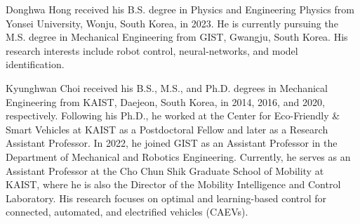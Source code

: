 \documentclass[journal]{IEEEtran}
\newcommand*{\template}{template}
\begin{document}
\begin{IEEEbiography}{Donghwa Hong}
    received his B.S. degree in Physics and Engineering Physics from Yonsei University, Wonju, South Korea, in 2023. He is currently pursuing the M.S. degree in Mechanical Engineering from GIST, Gwangju, South Korea.  
His research interests include robot control, neural-networks, and model identification. 
\end{IEEEbiography}

\begin{IEEEbiography}{Kyunghwan Choi}
    received his B.S., M.S., and Ph.D. degrees in Mechanical Engineering from KAIST, Daejeon, South Korea, in 2014, 2016, and 2020, respectively. Following his Ph.D., he worked at the Center for Eco-Friendly \& Smart Vehicles at KAIST as a Postdoctoral Fellow and later as a Research Assistant Professor. In 2022, he joined GIST as an Assistant Professor in the Department of Mechanical and Robotics Engineering. Currently, he serves as an Assistant Professor at the Cho Chun Shik Graduate School of Mobility at KAIST, where he is also the Director of the Mobility Intelligence and Control Laboratory. His research focuses on optimal and learning-based control for connected, automated, and electrified vehicles (CAEVs).
\end{IEEEbiography}
\end{document}

